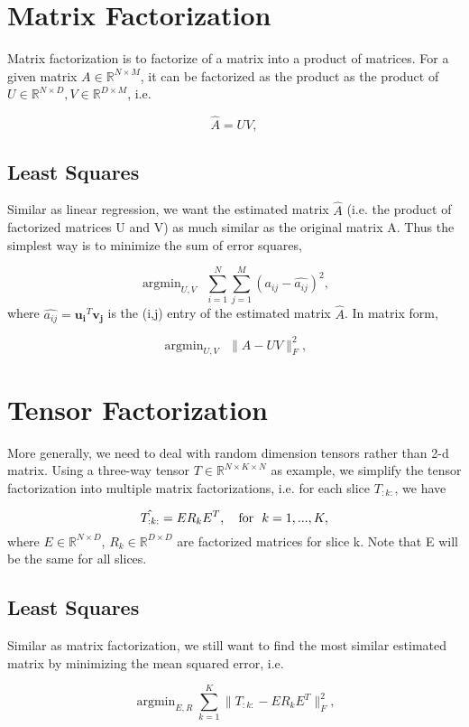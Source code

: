 \documentclass[11pt,a4paper]{article}
\begin{document}
\section{Matrix Factorization}
Matrix factorization is to factorize of a matrix into a product of matrices. For a given matrix $A \in \mathbb{R}^{N \times M}$, it can be factorized as the product as the product of $U \in \mathbb{R}^{N \times D}, V \in \mathbb{R}^{D \times M}$, i.e.

\begin{equation}
\hat{A} = UV,
\end{equation}

\subsection{Least Squares}

Similar as linear regression, we want the estimated matrix $\hat{A}$ (i.e. the product of factorized matrices U and V) as much similar as the original matrix A. Thus the simplest way is to minimize the sum of error squares, 

\begin{equation}
\mathop{\arg\min}_{U,V} \ \ \sum_{i=1}^N \sum_{j=1}^M (a_{ij} - \hat{a_{ij}})^2,
\end{equation}
where $\hat{a_{ij}} = \bm{u_i}^T \bm{v_j}$ is the (i,j) entry of the estimated matrix $\hat{A}$. In matrix form, 

\begin{equation}
\mathop{\arg\min}_{U,V} \ \ \|A - UV\|_F^2,
\end{equation}

\section{Tensor Factorization}

More generally, we need to deal with random dimension tensors rather than 2-d matrix. Using a three-way tensor $ T \in \mathbb{R}^{N \times K \times N} $ as example, we simplify the tensor factorization into multiple matrix factorizations, i.e. for each slice $T_{:k:}$, we have

\begin{equation}
\hat{T_{:k:}} = E R_k E^T, \ \ \ \textnormal{for} \ \ k = 1, ..., K,
\end{equation}
where $E \in \mathbb{R}^{N \times D}$, $R_k \in \mathbb{R}^{D \times D}$ are factorized matrices for slice k. Note that E will be the same for all slices.

\subsection{Least Squares}

Similar as matrix factorization, we still want to find the most similar estimated matrix by minimizing the mean squared error, i.e.

\begin{equation}
\mathop{\arg\min}_{E,R} \sum_{k=1}^K \|T_{:k:} - E R_k E^T\|_F^2,
\end{equation}

%
%
\end{document}

